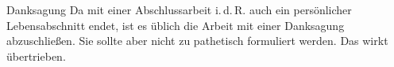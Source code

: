 \vspace*{0pt plus 1fill}
\begin{tucsimplesection}{Danksagung}
Da mit einer Abschlussarbeit i.\,d.\,R. auch ein persönlicher Lebensabschnitt
endet, ist es üblich die Arbeit mit einer Danksagung abzuschließen. Sie sollte aber
nicht zu pathetisch formuliert werden. Das wirkt übertrieben.

\lipsum[1-2]
\end{tucsimplesection}
\vspace*{0pt plus 2.5fill}
